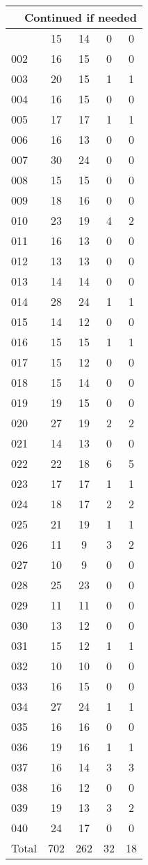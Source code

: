 \begin{center}
\begin{longtable}{l|c|c|c|c}
\hline \multicolumn{5}{|r|}{{Continued if needed}} \\ \hline
\endfoot 
001 & 15 & 14 & 0 & 0\\ \hline
002 & 16 & 15 & 0 & 0\\ \hline
003 & 20 & 15 & 1 & 1\\ \hline
004 & 16 & 15 & 0 & 0\\ \hline
005 & 17 & 17 & 1 & 1\\ \hline
006 & 16 & 13 & 0 & 0\\ \hline
007 & 30 & 24 & 0 & 0\\ \hline
008 & 15 & 15 & 0 & 0\\ \hline
009 & 18 & 16 & 0 & 0\\ \hline
010 & 23 & 19 & 4 & 2\\ \hline
011 & 16 & 13 & 0 & 0\\ \hline
012 & 13 & 13 & 0 & 0\\ \hline
013 & 14 & 14 & 0 & 0\\ \hline
014 & 28 & 24 & 1 & 1\\ \hline
015 & 14 & 12 & 0 & 0\\ \hline
016 & 15 & 15 & 1 & 1\\ \hline
017 & 15 & 12 & 0 & 0\\ \hline
018 & 15 & 14 & 0 & 0\\ \hline
019 & 19 & 15 & 0 & 0\\ \hline
020 & 27 & 19 & 2 & 2\\ \hline
021 & 14 & 13 & 0 & 0\\ \hline
022 & 22 & 18 & 6 & 5\\ \hline
023 & 17 & 17 & 1 & 1\\ \hline
024 & 18 & 17 & 2 & 2\\ \hline
025 & 21 & 19 & 1 & 1\\ \hline
026 & 11 & 9 & 3 & 2\\ \hline
027 & 10 & 9 & 0 & 0\\ \hline
028 & 25 & 23 & 0 & 0\\ \hline
029 & 11 & 11 & 0 & 0\\ \hline
030 & 13 & 12 & 0 & 0\\ \hline
031 & 15 & 12 & 1 & 1\\ \hline
032 & 10 & 10 & 0 & 0\\ \hline
033 & 16 & 15 & 0 & 0\\ \hline
034 & 27 & 24 & 1 & 1\\ \hline
035 & 16 & 16 & 0 & 0\\ \hline
036 & 19 & 16 & 1 & 1\\ \hline
037 & 16 & 14 & 3 & 3\\ \hline
038 & 16 & 12 & 0 & 0\\ \hline
039 & 19 & 13 & 3 & 2\\ \hline
040 & 24 & 17 & 0 & 0\\ \hline
\hline \hline
Total & 702 & 262 & 32 & 18



\end{longtable}
\end{center}
 
